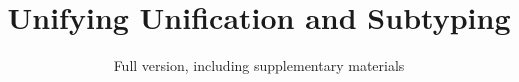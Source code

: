\documentclass[acmsmall,10pt,review,anonymous, dvipsnames]{acmart}\settopmatter{printfolios=true}
\begin{document}
\title{Unifying Unification and Subtyping}
\ifdefined\submitoption
\subtitle{Full version, including supplementary materials}         %
\fi

\begin{abstract}


\end{abstract}






\maketitle



% 


\ifdefined\submitoption
\fi

\end{document}
